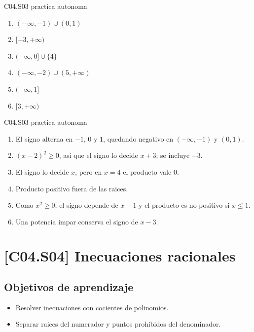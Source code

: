 \begin{shortanswer}{C04.S03 practica autonoma}
\begin{enumerate}[label=\textbf{PX-C04.S03-\arabic*:}, leftmargin=*]
  \item \((-\infty,-1)\cup (0,1)\)
  \item \([-3,+\infty)\)
  \item \((-\infty,0]\cup \{4\}\)
  \item \((-\infty,-2)\cup (5,+\infty)\)
  \item \((-\infty,1]\)
  \item \([3,+\infty)\)
\end{enumerate}
\end{shortanswer}

\begin{fullsolution}{C04.S03 practica autonoma}
\begin{enumerate}[label=\textbf{PX-C04.S03-\arabic*:}, leftmargin=*]
  \item El signo alterna en \(-1\), \(0\) y \(1\), quedando negativo en \((-\infty,-1)\) y \((0,1)\).
  \item \((x-2)^2\geq 0\), asi que el signo lo decide \(x+3\); se incluye \(-3\).
  \item El signo lo decide \(x\), pero en \(x=4\) el producto vale \(0\).
  \item Producto positivo fuera de las raices.
  \item Como \(x^2\geq 0\), el signo depende de \(x-1\) y el producto es no positivo si \(x\leq 1\).
  \item Una potencia impar conserva el signo de \(x-3\).
\end{enumerate}
\end{fullsolution}

\section{[C04.S04] Inecuaciones racionales}

\subsection*{Objetivos de aprendizaje}
\begin{itemize}
  \item Resolver inecuaciones con cocientes de polinomios.
  \item Separar raices del numerador y puntos prohibidos del denominador.
\end{itemize}

